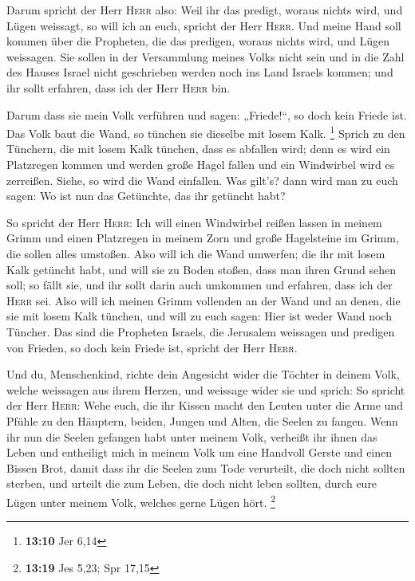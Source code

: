  Darum spricht der Herr \textsc{Herr} also: Weil ihr das
predigt, woraus nichts wird, und Lügen weissagt, so will ich an euch,
spricht der Herr \textsc{Herr}.  Und meine Hand soll
kommen über die Propheten, die das predigen, woraus nichts wird, und
Lügen weissagen. Sie sollen in der Versammlung meines Volks nicht sein
und in die Zahl des Hauses Israel nicht geschrieben werden noch ins Land
Israels kommen; und ihr sollt erfahren, dass ich der Herr \textsc{Herr}
bin.

 Darum dass sie mein Volk verführen und sagen:
„Friede!{}``, so doch kein Friede ist. Das Volk baut die Wand, so
tünchen sie dieselbe mit losem Kalk. \footnote{\textbf{13:10} Jer 6,14}
 Sprich zu den Tünchern, die mit losem Kalk tünchen, dass
es abfallen wird; denn es wird ein Platzregen kommen und werden große
Hagel fallen und ein Windwirbel wird es zerreißen. 
Siehe, so wird die Wand einfallen. Was gilt's? dann wird man zu euch
sagen: Wo ist nun das Getünchte, das ihr getüncht habt?

 So spricht der Herr \textsc{Herr}: Ich will einen
Windwirbel reißen lassen in meinem Grimm und einen Platzregen in meinem
Zorn und große Hagelsteine im Grimm, die sollen alles umstoßen.
 Also will ich die Wand umwerfen; die ihr mit losem Kalk
getüncht habt, und will sie zu Boden stoßen, dass man ihren Grund sehen
soll; so fällt sie, und ihr sollt darin auch umkommen und erfahren, dass
ich der \textsc{Herr} sei.  Also will ich meinen Grimm
vollenden an der Wand und an denen, die sie mit losem Kalk tünchen, und
will zu euch sagen: Hier ist weder Wand noch Tüncher. 
Das sind die Propheten Israels, die Jerusalem weissagen und predigen von
Frieden, so doch kein Friede ist, spricht der Herr \textsc{Herr}.

 Und du, Menschenkind, richte dein Angesicht wider die
Töchter in deinem Volk, welche weissagen aus ihrem Herzen, und weissage
wider sie  und sprich: So spricht der Herr \textsc{Herr}:
Wehe euch, die ihr Kissen macht den Leuten unter die Arme und Pfühle zu
den Häuptern, beiden, Jungen und Alten, die Seelen zu fangen. Wenn ihr
nun die Seelen gefangen habt unter meinem Volk, verheißt ihr ihnen das
Leben  und entheiligt mich in meinem Volk um eine
Handvoll Gerste und einen Bissen Brot, damit dass ihr die Seelen zum
Tode verurteilt, die doch nicht sollten sterben, und urteilt die zum
Leben, die doch nicht leben sollten, durch eure Lügen unter meinem Volk,
welches gerne Lügen hört. \footnote{\textbf{13:19} Jes 5,23; Spr 17,15}

